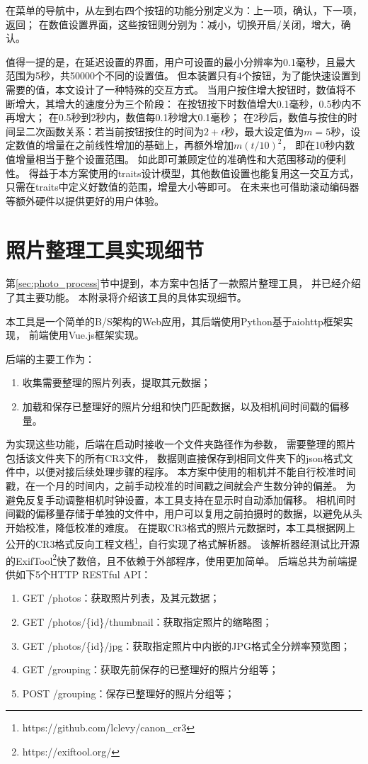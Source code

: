 在菜单的导航中，从左到右四个按钮的功能分别定义为：上一项，确认，下一项，返回；
在数值设置界面，这些按钮则分别为：减小，切换开启/关闭，增大，确认。

值得一提的是，在延迟设置的界面，用户可设置的最小分辨率为0.1毫秒，且最大范围为5秒，共50000个不同的设置值。
但本装置只有4个按钮，为了能快速设置到需要的值，本文设计了一种特殊的交互方式。
当用户按住增大按钮时，数值将不断增大，其增大的速度分为三个阶段：
在按钮按下时数值增大0.1毫秒，0.5秒内不再增大；
在0.5秒到2秒内，数值每0.1秒增大0.1毫秒；
在2秒后，数值与按住的时间呈二次函数关系：若当前按钮按住的时间为$2+t$秒，最大设定值为$m=5$秒，设定数值的增量在之前线性增加的基础上，再额外增加$m(t/10)^2$，
即在10秒内数值增量相当于整个设置范围。
如此即可兼顾定位的准确性和大范围移动的便利性。
得益于本方案使用的traits设计模型，其他数值设置也能复用这一交互方式，只需在traits中定义好数值的范围，增量大小等即可。
在未来也可借助滚动编码器等额外硬件以提供更好的用户体验。

\chapter{照片整理工具实现细节}

第\ref{sec:photo_process}节中提到，本方案中包括了一款照片整理工具，
并已经介绍了其主要功能。
本附录将介绍该工具的具体实现细节。

本工具是一个简单的B/S架构的Web应用，其后端使用Python基于aiohttp框架实现，
前端使用Vue.js框架实现。

后端的主要工作为：
\begin{enumerate}
\item 收集需要整理的照片列表，提取其元数据；
\item 加载和保存已整理好的照片分组和快门匹配数据，以及相机间时间戳的偏移量。
\end{enumerate}
为实现这些功能，后端在启动时接收一个文件夹路径作为参数，
需要整理的照片包括该文件夹下的所有CR3文件，
数据则直接保存到相同文件夹下的json格式文件中，以便对接后续处理步骤的程序。
本方案中使用的相机并不能自行校准时间戳，在一个月的时间内，之前手动校准的时间戳之间就会产生数分钟的偏差。
为避免反复手动调整相机时钟设置，本工具支持在显示时自动添加偏移。
相机间时间戳的偏移量存储于单独的文件中，用户可以复用之前拍摄时的数据，以避免从头开始校准，降低校准的难度。
在提取CR3格式的照片元数据时，本工具根据网上公开的CR3格式反向工程文档\footnote{https://github.com/lclevy/canon\_cr3}，自行实现了格式解析器。
该解析器经测试比开源的ExifTool\footnote{https://exiftool.org/}快了数倍，且不依赖于外部程序，使用更加简单。
后端总共为前端提供如下5个HTTP RESTful API：
\begin{enumerate}
\item GET /photos：获取照片列表，及其元数据；
\item GET /photos/\{id\}/thumbnail：获取指定照片的缩略图；
\item GET /photos/\{id\}/jpg：获取指定照片中内嵌的JPG格式全分辨率预览图；
\item GET /grouping：获取先前保存的已整理好的照片分组等；
\item POST /grouping：保存已整理好的照片分组等；
\end{enumerate}

